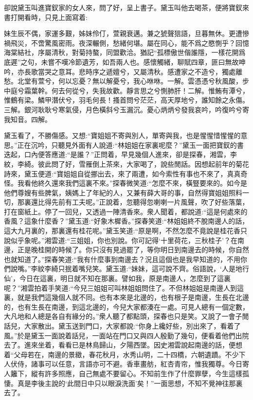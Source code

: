 


\begin{parag}
    卻說黛玉叫進寶釵家的女人來，問了好，呈上書子。黛玉叫他去喝茶，便將寶釵來書打開看時，只見上面寫着:
\end{parag}


\begin{qute2sp}
    妹生辰不偶，家運多艱，姊妹伶仃，萱親衰邁。兼之猇聲狺語，旦暮無休。更遭慘禍飛災，不啻驚風密雨。夜深輾側，愁緒何堪。屬在同心，能不爲之愍惻乎？回憶海棠結社，序屬清秋，對菊持螯，同盟歡洽。猶記“孤標傲世偕誰隱，一樣花開爲底遲”之句，未嘗不嘆冷節遺芳，如吾兩人也。感懷觸緒，聊賦四章，匪曰無故呻吟，亦長歌當哭之意耳。悲時序之遞嬗兮，又屬清秋。感遭家之不造兮，獨處離愁。北堂有萱兮，何以忘憂？無以解憂兮，我心咻咻。一解。雲憑憑兮秋風酸，步中庭兮霜葉幹。何去何從兮，失我故歡。靜言思之兮惻肺肝！二解。惟鮪有潭兮，惟鶴有梁。鱗甲潛伏兮，羽毛何長！搔首問兮茫茫，高天厚地兮，誰知餘之永傷。三解。銀河耿耿兮寒氣侵，月色橫斜兮玉漏沉。憂心炳炳兮發我哀吟，吟復吟兮寄我知音。四解。
\end{qute2sp}


\begin{parag}
    黛玉看了，不勝傷感。又想:“寶姐姐不寄與別人，單寄與我，也是惺惺惜惺惺的意思。”正在沉吟，只聽見外面有人說道:“林姐姐在家裏呢麼？”黛玉一面把寶釵的書迭起，口內便答應道:“是誰？”正問着，早見幾個人進來，卻是探春，湘雲，李紋，李綺。彼此問了好，雪雁倒上茶來，大家喝了，說些閒話。因想起前年的菊花詩來，黛玉便道:“寶姐姐自從挪出去，來了兩遭，如今索性有事也不來了，真真奇怪。我看他終久還來我們這裏不來。”探春微笑道:“怎麼不來，橫豎要來的。如今是他們尊嫂有些脾氣，姨媽上了年紀的人，又兼有薛大哥的事，自然得寶姐姐照料一切，那裏還比得先前有工夫呢。”正說着，忽聽得忽喇喇一片風聲，吹了好些落葉，打在窗紙上。停了一回兒，又透過一陣清香來。衆人聞着，都說道:“這是何處來的香風？這象什麼香？”黛玉道:“好象木樨香。”探春笑道:“林姐姐終不脫南邊人的話，這大九月裏的，那裏還有桂花呢。”黛玉笑道:“原是啊，不然怎麼不竟說是桂花香只說似乎象呢。”湘雲道:“三姐姐，你也別說。你可記得‘十里荷花，三秋桂子’？在南邊，正是晚桂開的時候了。你只沒有見過罷了，等你明日到南邊去的時候，你自然也就知道了。”探春笑道:“我有什麼事到南邊去？況且這個也是我早知道的，不用你們說嘴。”李紋李綺只抿着嘴兒笑。黛玉道:“妹妹，這可說不齊。俗語說，‘人是地行仙’，今日在這裏，明日就不知在那裏。譬如我，原是南邊人，怎麼到了這裏呢？”湘雲拍着手笑道:“今兒三姐姐可叫林姐姐問住了。不但林姐姐是南邊人到這裏，就是我們這幾個人就不同。也有本來是北邊的，也有根子是南邊，生長在北邊的，也有生長在南邊，到這北邊的，今兒大家都湊在一處。可見人總有一個定數，大凡地和人總是各自有緣分的。”衆人聽了都點頭，探春也只是笑。又說了一會子閒話兒，大家散出。黛玉送到門口，大家都說:“你身上纔好些，別出來了，看着了風。”於是黛玉一面說着話兒，一面站在門口又與四人殷勤了幾句，便看着他們出院去了。進來坐着，看看已是林鳥歸山，夕陽西墜。因史湘雲說起南邊的話，便想着“父母若在，南邊的景緻，春花秋月，水秀山明，二十四橋，六朝遺蹟。不少下人伏侍，諸事可以任意，言語亦可不避。香車畫舫，紅杏青帘，惟我獨尊。今日寄人籬下，縱有許多照應，自己無處不要留心。不知前生作了什麼罪孽，今生這樣孤悽。真是李後主說的‘此間日中只以眼淚洗面’矣！”一面思想，不知不覺神往那裏去了。
\end{parag}


